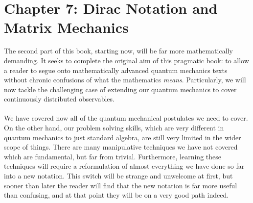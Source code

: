 \chapter{Chapter 7: Dirac Notation and Matrix Mechanics}
The second part of this book, starting now, will be far more mathematically demanding. It seeks to complete the original aim of this pragmatic book: to allow a reader to segue onto mathematically advanced quantum mechanics texts without chronic confusions of what the mathematics \textit{means}. Particularly, we will now tackle the challenging case of extending our quantum mechanics to cover continuously distributed observables.
\\\\
We have covered now all of the quantum mechanical postulates we need to cover. On the other hand, our problem solving skills, which are very different in quantum mechanics to just standard algebra, are still very limited in the wider scope of things. There are many manipulative techniques we have not covered which are fundamental, but far from trivial. Furthermore, learning these techniques will require a reformulation of almost everything we have done so far into a new notation. This switch will be strange and unwelcome at first, but sooner than later the reader will find that the new notation is far more useful than confusing, and at that point they will be on a very good path indeed.
\\\\
